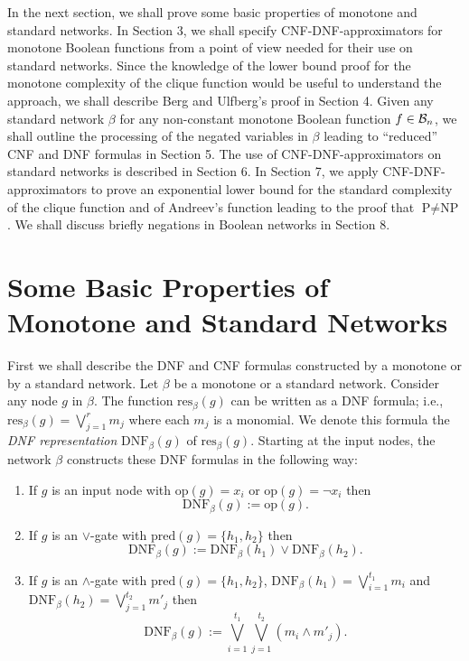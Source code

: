 \documentclass[11pt]{article}
\begin{document}
In the next section, we shall prove some basic properties of monotone and standard networks. In Section 3, we
shall specify CNF-DNF-approximators for monotone Boolean functions from a point of view needed for their use
on standard networks. Since the knowledge of the lower bound proof for the monotone complexity of the clique
function would be useful to understand the approach, we shall describe Berg and Ulfberg's proof \cite{BeUl} in
Section 4. Given any standard network $\beta$ for any non-constant monotone Boolean function $f \in {\cal B}_n$,
we shall outline the processing of the negated variables in $\beta$ leading to ``reduced'' CNF and DNF formulas in
Section 5. The use of CNF-DNF-approximators on standard networks is described in Section 6. In Section 7, we apply
CNF-DNF-approximators to prove an exponential lower bound for the standard complexity of the clique function and of
Andreev's function leading to the proof that $\mbox{P} \not= \mbox{NP}$. We shall discuss briefly negations in
Boolean networks in Section 8.

\section{Some Basic Properties of Monotone and Standard Networks} 

First we shall describe the DNF and CNF formulas constructed by a monotone or by a standard network.
Let $\beta$ be a monotone or a standard network.
Consider any node $g$ in $\beta$. The function $\mbox{res}_{\beta}(g)$ can be written as a DNF formula; i.e.,
$\mbox{res}_{\beta}(g) = \bigvee_{j=1}^r m_j$ where each $m_j$ is a monomial.
We denote this formula the {\em DNF representation\/} $\mbox{DNF}_{\beta}(g)$ of $\mbox{res}_{\beta}(g)$.
Starting at the input nodes, the network $\beta$ constructs these DNF formulas in the following way:
\begin{enumerate}
\item
  If $g$ is an input node with $\mbox{op}(g) = x_i$ or $\mbox{op}(g) = \neg x_i$ then 
  $$\mbox{DNF}_{\beta}(g) := \mbox{op}(g).$$
\item
  If $g$ is an $\vee$-gate with $\mbox{pred}(g) = \{h_1,h_2\}$ then 
  $$\mbox{DNF}_{\beta}(g) := \mbox{DNF}_{\beta}(h_1) \vee \mbox{DNF}_{\beta}(h_2).$$
\item
  If $g$ is an $\wedge$-gate with $\mbox{pred}(g) = \{h_1,h_2\}$, $\mbox{DNF}_{\beta}(h_1) = \bigvee_{i=1}^{t_1} m_i$
  and $\mbox{DNF}_{\beta}(h_2) = \bigvee_{j=1}^{t_2} m'_j$ then
  $$\mbox{DNF}_{\beta}(g) := \bigvee_{i=1}^{t_1}\bigvee_{j=1}^{t_2} (m_i \wedge m'_j).$$
\end{enumerate}
\end{document}

